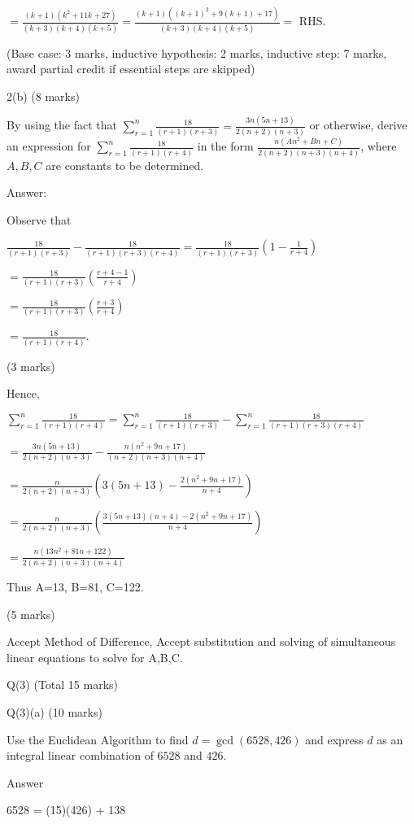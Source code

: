 \documentclass[a4paper,12pt,oneside]{book}
\theoremstyle{definition}
\begin{document}
$= \frac{(k+1)(k^2+11k+27)}{(k+3)(k+4)(k+5)} = \frac{(k+1)((k+1)^2+9(k+1)+17)}{(k+3)(k+4)(k+5)} = $ RHS.

(Base case: 3 marks, inductive hypothesis: 2 marks, inductive step: 7 marks, award partial credit if essential steps are skipped)

2(b) (8 marks) 

By using the fact that $\sum_{r=1}^n \frac{18}{(r+1)(r+3)} = \frac{3n(5n+13)}{2(n+2)(n+3)}$ or otherwise, derive an expression for $\sum_{r=1}^n \frac{18}{(r+1)(r+4)}$ in the form $\frac{n(An^2+Bn+C)}{2(n+2)(n+3)(n+4)}$, where $A,B,C$ are constants to be determined.

Answer:

Observe that 

$\frac{18}{(r+1)(r+3)} - \frac{18}{(r+1)(r+3)(r+4)} = \frac{18}{(r+1)(r+3)} \left( 1 - \frac{1}{r+4} \right)$

$= \frac{18}{(r+1)(r+3)} \left( \frac{r+4-1}{r+4} \right)$

$= \frac{18}{(r+1)(r+3)} \left( \frac{r+3}{r+4} \right)$

$= \frac{18}{(r+1)(r+4)}$.

(3 marks)

Hence,

$\sum_{r=1}^n \frac{18}{(r+1)(r+4)} = \sum_{r=1}^n \frac{18}{(r+1)(r+3)} - \sum_{r=1}^n \frac{18}{(r+1)(r+3)(r+4)}$ 

$= \frac{3n(5n+13)}{2(n+2)(n+3)} - \frac{n(n^2+9n+17)}{(n+2)(n+3)(n+4)}$

$= \frac{n}{2(n+2)(n+3)} \left( 3(5n+13) - \frac{2(n^2+9n+17)}{n+4} \right)$

$= \frac{n}{2(n+2)(n+3)} \left( \frac{3(5n+13)(n+4) - 2(n^2+9n+17)}{n+4} \right)$

$= \frac{n(13n^2+81n+122)}{2(n+2)(n+3)(n+4)}$

Thus A=13, B=81, C=122.

(5 marks)

Accept Method of Difference, Accept substitution and solving of simultaneous linear equations to solve for A,B,C.

\newpage

Q(3) (Total 15 marks)

Q(3)(a) (10 marks)

Use the Euclidean Algorithm to find $d=\gcd(6528,426)$ and express $d$ as an integral linear combination of $6528$ and $426$.

Answer

6528 = (15)(426) + 138
\end{document}
